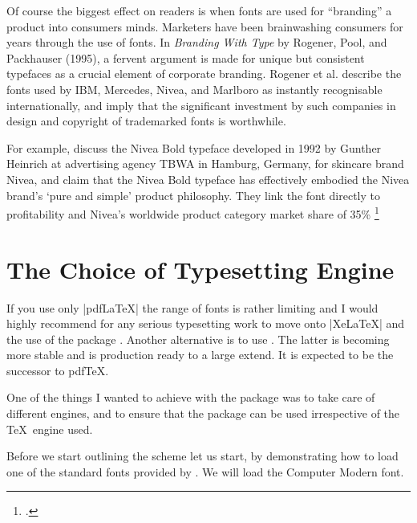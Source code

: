 Of course the biggest effect on readers is when fonts are used for ``branding'' a product into consumers minds. 
Marketers have been brainwashing
consumers for years through the use of fonts. In \textit{Branding
With Type}  by Rogener, Pool, and Packhauser
(1995), a fervent argument is made for unique
but consistent typefaces as a crucial element of
corporate branding. Rogener et al. describe the
fonts used by IBM, Mercedes, Nivea, and
Marlboro as instantly recognisable
internationally, and imply that the significant
investment by such companies in design and
copyright of trademarked fonts is worthwhile. 

For example, \citeauthor{rogener1995} discuss the Nivea
Bold typeface developed in 1992 by Gunther
Heinrich at advertising agency \textsc{TBWA} in
Hamburg, Germany, for skincare brand Nivea,
and claim that the Nivea Bold typeface has
effectively embodied the Nivea brand’s `pure
and simple’ product philosophy. They link the
font directly to profitability and Nivea’s
worldwide product category market share of
35\% \footcite[p. 91]{rogener1995} 


\section{The Choice of Typesetting Engine}

If you use only |pdfLaTeX| the range of fonts is rather limiting and I would highly recommend for any serious typesetting work to move onto |XeLaTeX| and the use of the package  \citep{fontspec}. Another alternative is to use \lualatex. The latter is becoming more stable and is production ready to a large extend. It is expected to be the successor to pdfTeX.

One of the things I wanted to achieve with the  package was  to take care of different \tex engines, and to ensure that the package can be used irrespective of the \TeX\ engine used. 

Before we start outlining the scheme let us start, by demonstrating how to load one of the standard fonts provided by \latexe. We will load the Computer Modern font. 



